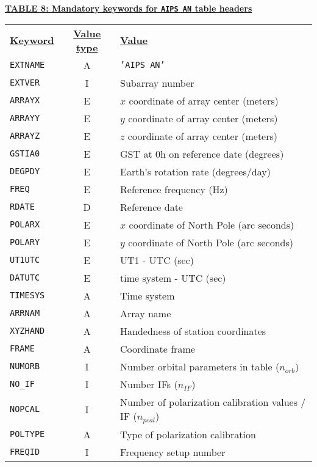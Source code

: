 \documentclass[twoside]{article}
\newcommand{\nif}{$n_{IF}$}
\newcommand{\norb}{$n_{orb}$}
\newcommand{\npcal}{$n_{pcal}$}
\begin{document}
\begin{center}
\underline{\bf{TABLE 8: Mandatory keywords for {\tt AIPS AN} table
    headers}}\\
\begin{tabular}{lcl}
\noalign{\vspace{2pt}} \label{ta:ANkeys}
\underline{{\bf Keyword}} & \underline{\bf{Value type}} &
    \underline{\bf{Value\vphantom{y}}} \\
\noalign{\vspace{2pt}}
{\tt EXTNAME}   & A & {\tt 'AIPS AN'}  \\
{\tt EXTVER}    & I & Subarray number \\
{\tt ARRAYX}    & E & $x$ coordinate of array center (meters) \\
{\tt ARRAYY}    & E & $y$ coordinate of array center (meters) \\
{\tt ARRAYZ}    & E & $z$ coordinate of array center (meters) \\
{\tt GSTIA0}    & E & GST at 0h on reference date (degrees) \\
{\tt DEGPDY}    & E & Earth's rotation rate (degrees/day) \\
{\tt FREQ}      & E & Reference frequency (Hz) \\
{\tt RDATE}     & D & Reference date \\
{\tt POLARX}    & E & $x$ coordinate of North Pole (arc seconds) \\
{\tt POLARY}    & E & $y$ coordinate of North Pole (arc seconds) \\
{\tt UT1UTC}    & E & UT1 - UTC (sec) \\
{\tt DATUTC}    & E & time system - UTC (sec) \\
{\tt TIMESYS}   & A & Time system \\
{\tt ARRNAM}    & A & Array name \\
{\tt XYZHAND}   & A & Handedness of station coordinates \\
{\tt FRAME}     & A & Coordinate frame \\
{\tt NUMORB}    & I & Number orbital parameters in table (\norb) \\
{\tt NO\_IF}    & I & Number IFs (\nif) \\
{\tt NOPCAL}    & I & Number of polarization calibration values / IF (\npcal) \\
{\tt POLTYPE}   & A & Type of polarization calibration \\
{\tt FREQID}    & I & Frequency setup number
\end{tabular}
\end{center}
\end{document}
